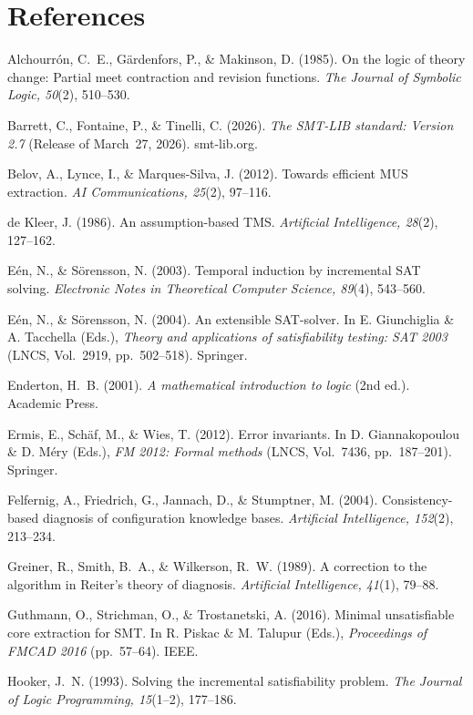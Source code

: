 \documentclass[11pt,reqno]{amsart}
\theoremstyle{plain}
\theoremstyle{definition}
\newenvironment{references}
  {\section*{References}\small\setlength{\parindent}{0pt}%
   \everypar{\hangindent=1.6em\hangafter=1}\setlength{\parskip}{3pt}}
  {\par}
\begin{document}
\begin{references}

Alchourr\'on, C.~E., G\"ardenfors, P., \& Makinson, D. (1985). On the logic of
theory change: Partial meet contraction and revision functions. \emph{The Journal
of Symbolic Logic, 50}(2), 510--530.

Barrett, C., Fontaine, P., \& Tinelli, C. (2026). \emph{The SMT-LIB standard:
Version 2.7} (Release of March~27, 2026). smt-lib.org.

Belov, A., Lynce, I., \& Marques-Silva, J. (2012). Towards efficient MUS
extraction. \emph{AI Communications, 25}(2), 97--116.

de Kleer, J. (1986). An assumption-based TMS. \emph{Artificial Intelligence,
28}(2), 127--162.

E\'en, N., \& S\"orensson, N. (2003). Temporal induction by incremental SAT
solving. \emph{Electronic Notes in Theoretical Computer Science, 89}(4), 543--560.

E\'en, N., \& S\"orensson, N. (2004). An extensible SAT-solver. In E. Giunchiglia
\& A. Tacchella (Eds.), \emph{Theory and applications of satisfiability testing:
SAT 2003} (LNCS, Vol.~2919, pp.~502--518). Springer.

Enderton, H.~B. (2001). \emph{A mathematical introduction to logic} (2nd ed.).
Academic Press.

Ermis, E., Sch\"af, M., \& Wies, T. (2012). Error invariants. In D. Giannakopoulou
\& D. M\'ery (Eds.), \emph{FM 2012: Formal methods} (LNCS, Vol.~7436,
pp.~187--201). Springer.

Felfernig, A., Friedrich, G., Jannach, D., \& Stumptner, M. (2004).
Consistency-based diagnosis of configuration knowledge bases. \emph{Artificial
Intelligence, 152}(2), 213--234.

Greiner, R., Smith, B.~A., \& Wilkerson, R.~W. (1989). A correction to the
algorithm in Reiter's theory of diagnosis. \emph{Artificial Intelligence, 41}(1),
79--88.

Guthmann, O., Strichman, O., \& Trostanetski, A. (2016). Minimal unsatisfiable core
extraction for SMT. In R. Piskac \& M. Talupur (Eds.), \emph{Proceedings of FMCAD
2016} (pp.~57--64). IEEE.

Hooker, J.~N. (1993). Solving the incremental satisfiability problem. \emph{The
Journal of Logic Programming, 15}(1--2), 177--186.


\end{references}
\end{document}
